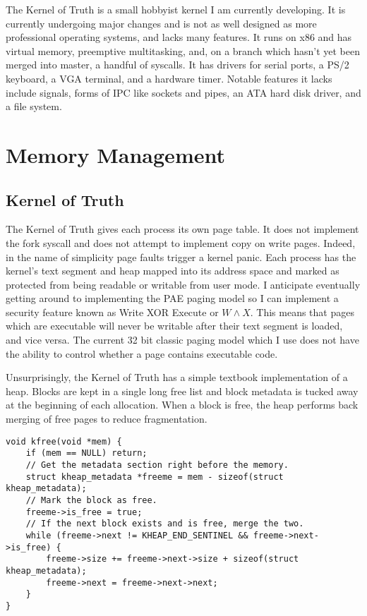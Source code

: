 \documentclass[10pt,conference,draftclsnofoot,onecolumn]{IEEEtran}
\begin{document}
The Kernel of Truth is a small hobbyist kernel I am currently developing. It is currently undergoing major changes and is not as well designed as more professional operating systems, and lacks many features. It runs on x86 and has virtual memory, preemptive multitasking, and, on a branch which hasn't yet been merged into master, a handful of syscalls. It has drivers for serial ports, a PS/2 keyboard, a VGA terminal, and a hardware timer. Notable features it lacks include signals, forms of IPC like sockets and pipes, an ATA hard disk driver, and a file system\cite{4_kronquist_2016}.

\section{Memory Management}


\subsection{Kernel of Truth}
The Kernel of Truth gives each process its own page table. It does not implement the fork syscall and does not attempt to implement copy on write pages. Indeed, in the name of simplicity page faults trigger a kernel panic. Each process has the kernel's text segment and heap mapped into its address space and marked as protected from being readable or writable from user mode. I anticipate eventually getting around to implementing the PAE paging model so I can implement a security feature known as Write XOR Execute or $W\wedge X$. This means that pages which are executable will never be writable after their text segment is loaded, and vice versa. The current 32 bit classic paging model which I use does not have the ability to control whether a page contains executable code.

Unsurprisingly, the Kernel of Truth has a simple textbook implementation of a heap. Blocks are kept in a single long free list and block metadata is tucked away at the beginning of each allocation. When a block is free, the heap performs back merging of free pages to reduce fragmentation.

\begin{lstlisting}
void kfree(void *mem) {
    if (mem == NULL) return;
    // Get the metadata section right before the memory.
    struct kheap_metadata *freeme = mem - sizeof(struct kheap_metadata);
    // Mark the block as free.
    freeme->is_free = true;
    // If the next block exists and is free, merge the two.
    while (freeme->next != KHEAP_END_SENTINEL && freeme->next->is_free) {
        freeme->size += freeme->next->size + sizeof(struct kheap_metadata);
        freeme->next = freeme->next->next;
    }
}
\end{lstlisting}
\end{document}
